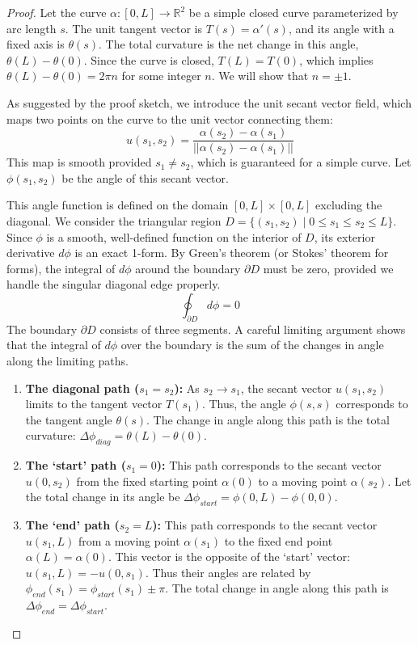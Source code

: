 \documentclass{article}
\begin{document}
\begin{proof}
Let the curve $\alpha: [0, L] \to \mathbb{R}^2$ be a simple closed curve parameterized by arc length $s$. The unit tangent vector is $T(s) = \alpha'(s)$, and its angle with a fixed axis is $\theta(s)$. The total curvature is the net change in this angle, $\theta(L) - \theta(0)$. Since the curve is closed, $T(L) = T(0)$, which implies $\theta(L) - \theta(0) = 2\pi n$ for some integer $n$. We will show that $n = \pm 1$.

As suggested by the proof sketch, we introduce the unit secant vector field, which maps two points on the curve to the unit vector connecting them:
\[ u(s_1, s_2) = \frac{\alpha(s_2) - \alpha(s_1)}{||\alpha(s_2) - \alpha(s_1)||} \]
This map is smooth provided $s_1 \neq s_2$, which is guaranteed for a simple curve. Let $\phi(s_1, s_2)$ be the angle of this secant vector.

This angle function is defined on the domain $[0, L] \times [0, L]$ excluding the diagonal. We consider the triangular region $D = \{(s_1, s_2) \mid 0 \le s_1 \le s_2 \le L\}$. Since $\phi$ is a smooth, well-defined function on the interior of $D$, its exterior derivative $d\phi$ is an exact 1-form. By Green's theorem (or Stokes' theorem for forms), the integral of $d\phi$ around the boundary $\partial D$ must be zero, provided we handle the singular diagonal edge properly.
\[ \oint_{\partial D} d\phi = 0 \]
The boundary $\partial D$ consists of three segments. A careful limiting argument shows that the integral of $d\phi$ over the boundary is the sum of the changes in angle along the limiting paths.
\begin{enumerate}
    \item \textbf{The diagonal path ($s_1=s_2$):} As $s_2 \to s_1$, the secant vector $u(s_1, s_2)$ limits to the tangent vector $T(s_1)$. Thus, the angle $\phi(s,s)$ corresponds to the tangent angle $\theta(s)$. The change in angle along this path is the total curvature: $\Delta\phi_{diag} = \theta(L) - \theta(0)$.

    \item \textbf{The `start' path ($s_1=0$):} This path corresponds to the secant vector $u(0,s_2)$ from the fixed starting point $\alpha(0)$ to a moving point $\alpha(s_2)$. Let the total change in its angle be $\Delta\phi_{start} = \phi(0,L) - \phi(0,0)$.

    \item \textbf{The `end' path ($s_2=L$):} This path corresponds to the secant vector $u(s_1,L)$ from a moving point $\alpha(s_1)$ to the fixed end point $\alpha(L)=\alpha(0)$. This vector is the opposite of the `start' vector: $u(s_1,L) = -u(0,s_1)$. Thus their angles are related by $\phi_{end}(s_1) = \phi_{start}(s_1) \pm \pi$. The total change in angle along this path is $\Delta\phi_{end} = \Delta\phi_{start}$.
\end{enumerate}


\end{proof}
\end{document}
